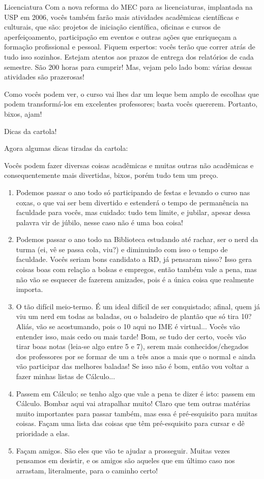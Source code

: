 \begin{subsecao}{Licenciatura}
Com a nova reforma do MEC para as licenciaturas, implantada na USP em 2006,
vocês também farão mais atividades acadêmicas científicas e culturais, que são:
projetos de iniciação científica, oficinas e cursos de aperfeiçoamento,
participação em eventos e outras ações que enriqueçam a formação profissional e
pessoal. Fiquem espertos: vocês terão que correr atrás de tudo isso
sozinhos. Estejam atentos aos prazos de entrega dos relatórios de cada
semestre. São 200 horas para cumprir! Mas, vejam pelo lado bom: várias dessas
atividades são prazerosas!

Como vocês podem ver, o curso vai lhes dar um leque bem amplo de escolhas que
podem transformá-los em excelentes professores; basta vocês quererem. Portanto,
bixos, ajam!

\begin{subsubsecao}{Dicas da cartola!}

Agora algumas dicas tiradas da cartola:

Vocês podem fazer diversas coisas acadêmicas e muitas outras não acadêmicas e
consequentemente mais divertidas, bixos, porém tudo tem um preço.
\begin{enumerate}
\item Podemos passar o ano todo só participando de festas e levando o curso nas
  coxas, o que vai ser bem divertido e estenderá o tempo de permanência na
  faculdade para vocês, mas cuidado: tudo tem limite, e jubilar, apesar dessa
  palavra vir de júbilo, nesse caso não é uma boa coisa!
\item Podemos passar o ano todo na Biblioteca estudando até rachar, ser o nerd
  da turma (ei, vê se passa cola, viu?) e diminuindo com isso o tempo de
  faculdade. Vocês seriam bons candidato a RD, já pensaram nisso? Isso gera
  coisas boas com relação a bolsas e empregos, então também vale a pena, mas não
  vão se esquecer de fazerem amizades, pois é a única coisa que realmente
  importa.
\item O tão difícil meio-termo. É um ideal difícil de ser conquistado; afinal,
  quem já viu um nerd em todas as baladas, ou o baladeiro de plantão que só tira
  10? Aliás, vão se acostumando, pois o 10 aqui no IME é virtual... Vocês vão
  entender isso, mais cedo ou mais tarde! Bom, se tudo der certo, vocês vão
  tirar boas notas (leia-se algo entre 5 e 7), serem mais conhecidos/chegados
  dos professores por se formar de um a três anos a mais que o normal e ainda
  vão participar das melhores baladas! Se isso não é bom, então vou voltar a
  fazer minhas listas de Cálculo...
\item Passem em Cálculo; se tenho algo que vale a pena te dizer é isto: passem
  em Cálculo. Bombar aqui vai atrapalhar muito! Claro que tem outras matérias
  muito importantes para passar também, mas essa é pré-esquisito para muitas
  coisas. Façam uma lista das coisas que têm pré-esquisito para cursar e dê
  prioridade a elas.
\item Façam amigos. São eles que vão te ajudar a prosseguir. Muitas vezes
  pensamos em desistir, e os amigos são aqueles que em último caso nos arrastam,
  literalmente, para o caminho certo!


\end{enumerate}
\end{subsubsecao}
\end{subsecao}
